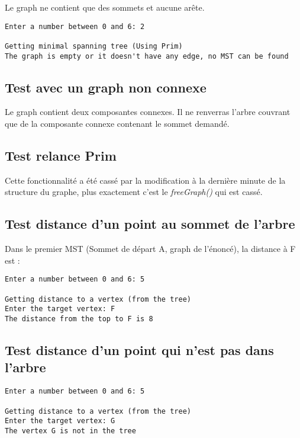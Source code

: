 \documentclass[12pt, a4paper,twoside]{article}
\begin{document}
    Le graph ne contient que des sommets et aucune arête.

    \begin{lstlisting}[]
Enter a number between 0 and 6: 2

Getting minimal spanning tree (Using Prim)
The graph is empty or it doesn't have any edge, no MST can be found
    \end{lstlisting}

    \subsection{Test avec un graph non connexe}

    Le graph contient deux composantes connexes. Il ne renverras l'arbre couvrant que de la composante connexe contenant le sommet demandé.

    \subsection{Test relance Prim}

        Cette fonctionnalité a été cassé par la modification à la dernière minute de la structure du graphe, plus exactement c'est le \textit{freeGraph()} qui est cassé.

    \subsection{Test distance d'un point au sommet de l'arbre}

    Dans le premier MST (Sommet de départ A, graph de l'énoncé), la distance à F est :

    \begin{lstlisting}
Enter a number between 0 and 6: 5

Getting distance to a vertex (from the tree)
Enter the target vertex: F
The distance from the top to F is 8
    \end{lstlisting}
    \subsection{Test distance d'un point qui n'est pas dans l'arbre}

    \begin{lstlisting}
Enter a number between 0 and 6: 5

Getting distance to a vertex (from the tree)
Enter the target vertex: G
The vertex G is not in the tree
    \end{lstlisting}
\end{document}
